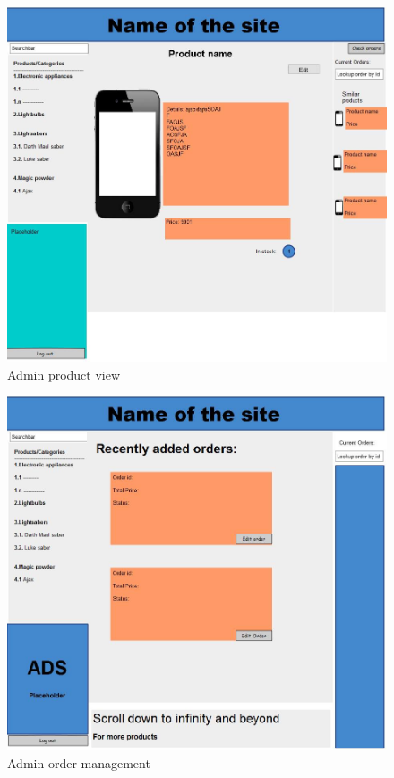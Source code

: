 \documentclass[a4paper,12pt]{article}
\begin{document}
\begin{figure}[htbp]
	\caption{Admin product view}
	\includegraphics[width=\textwidth,height=\textheight,keepaspectratio]{img/Admin_product.png}
\end{figure}

\begin{figure}[htbp]
	\caption{Admin order management}
	\includegraphics[width=\textwidth,height=\textheight,keepaspectratio]{img/Admin_order.png}
\end{figure}
\end{document}
